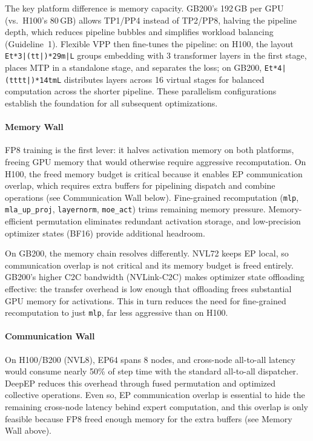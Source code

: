 \documentclass[10pt,logo,copyright]{nvidiatechreport}
\begin{document}
The key platform difference is memory capacity. GB200's 192\,GB per GPU (vs.\ H100's 80\,GB) allows TP1/PP4 instead of TP2/PP8, halving the pipeline depth, which reduces pipeline bubbles and simplifies workload balancing (Guideline~1). Flexible VPP then fine-tunes the pipeline: on H100, the layout \texttt{Et*3|(tt|)*29m|L} groups embedding with 3 transformer layers in the first stage, places MTP in a standalone stage, and separates the loss; on GB200, \texttt{Et*4|(tttt|)*14tmL} distributes layers across 16 virtual stages for balanced computation across the shorter pipeline. These parallelism configurations establish the foundation for all subsequent optimizations.

\paragraph*{Memory Wall}
FP8 training is the first lever: it halves activation memory on both platforms, freeing GPU memory that would otherwise require aggressive recomputation. On H100, the freed memory budget is critical because it enables EP communication overlap, which requires extra buffers for pipelining dispatch and combine operations (see Communication Wall below). Fine-grained recomputation (\texttt{mlp}, \texttt{mla\_up\_proj}, \texttt{layernorm}, \texttt{moe\_act}) trims remaining memory pressure. Memory-efficient permutation eliminates redundant activation storage, and low-precision optimizer states (BF16) provide additional headroom.

On GB200, the memory chain resolves differently. NVL72 keeps EP local, so communication overlap is not critical and its memory budget is freed entirely. GB200's higher C2C bandwidth (NVLink-C2C) makes optimizer state offloading effective: the transfer overhead is low enough that offloading frees substantial GPU memory for activations. This in turn reduces the need for fine-grained recomputation to just \texttt{mlp}, far less aggressive than on H100.

\paragraph*{Communication Wall}
On H100/B200 (NVL8), EP64 spans 8 nodes, and cross-node all-to-all latency would consume nearly 50\% of step time with the standard all-to-all dispatcher. DeepEP reduces this overhead through fused permutation and optimized collective operations. Even so, EP communication overlap is essential to hide the remaining cross-node latency behind expert computation, and this overlap is only feasible because FP8 freed enough memory for the extra buffers (see Memory Wall above).
\end{document}
